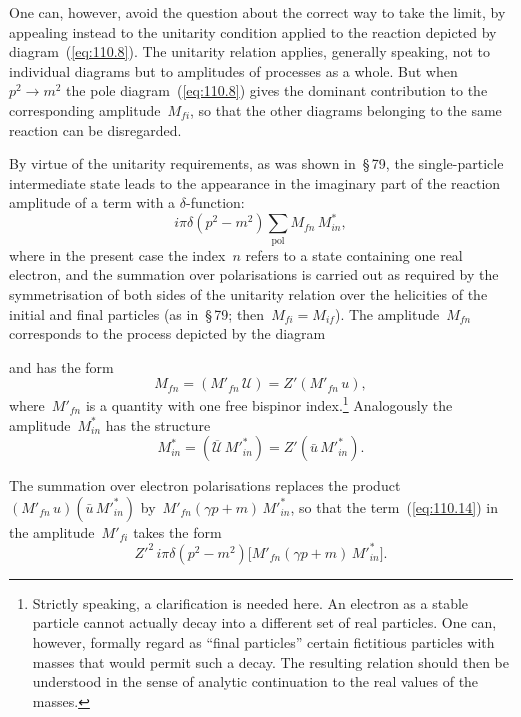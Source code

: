 
One can, however, avoid the question about the correct way to take the limit, by appealing instead to the unitarity condition applied to the reaction depicted by diagram~(\ref{eq:110.8}). The unitarity relation applies, generally speaking, not to individual diagrams but to amplitudes of processes as a whole. But when~$p^2 \to m^2$ the pole diagram~(\ref{eq:110.8}) gives the dominant contribution to the corresponding amplitude~$M_{fi}$, so that the other diagrams belonging to the same reaction can be disregarded.

By virtue of the unitarity requirements, as was shown in~\S\,79, the single-particle intermediate state leads to the appearance in the imaginary part of the reaction amplitude of a term with a $\delta$-function:
\begin{equation}
i\pi\delta(p^2 - m^2)\sum_{\text{pol}} M_{fn}\,M_{in}^*,
\label{eq:110.14}
\end{equation}
where in the present case the index~$n$ refers to a state containing one real electron, and the summation over polarisations is carried out as required by the symmetrisation of both sides of the unitarity relation over the helicities of the initial and final particles (as in~\S\,79; then~$M_{fi} = M_{if}$). The amplitude~$M_{fn}$ corresponds to the process depicted by the diagram


\noindent and has the form
\[
M_{fn} = (M'_{fn}\,\mathcal{U}) = Z'(M'_{fn}\,u),
\]
where~$M'_{fn}$ is a quantity with one free bispinor index.\footnote{Strictly speaking, a clarification is needed here. An electron as a stable particle cannot actually decay into a different set of real particles. One can, however, formally regard as ``final particles'' certain fictitious particles with masses that would permit such a decay. The resulting relation should then be understood in the sense of analytic continuation to the real values of the masses.} Analogously the amplitude~$M_{in}^*$ has the structure
\[
M_{in}^* = (\overline{\mathcal{U}}\,M'^*_{in}) = Z'(\bar{u}\,M'^*_{in}).
\]


The summation over electron polarisations replaces the product $(M'_{fn}\,u)(\bar{u}\,M'^*_{in})$ by~$M'_{fn}(\gamma p + m)\,M'^*_{in}$, so that the term~(\ref{eq:110.14}) in the amplitude~$M'_{fi}$ takes the form
\[
Z'^2\,i\pi\delta(p^2 - m^2)\bigl[M'_{fn}(\gamma p + m)\,M'^{*}_{in}\bigr].
\]

